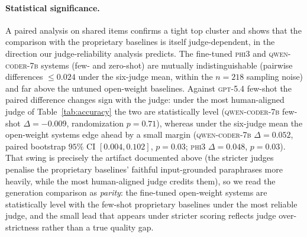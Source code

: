 \paragraph{Statistical significance.}
A paired analysis on shared items confirms a tight top cluster and shows that the comparison with the proprietary baselines is itself judge-dependent, in the direction our judge-reliability analysis predicts. The fine-tuned \textsc{phi3} and \textsc{qwen-coder-7b} systems (few- and zero-shot) are mutually indistinguishable (pairwise differences $\le 0.024$ under the six-judge mean, within the $n{=}218$ sampling noise) and far above the untuned open-weight baselines. Against \textsc{gpt-5.4} few-shot the paired difference changes sign with the judge: under the most human-aligned judge of Table~\ref{tab:accuracy} the two are statistically level (\textsc{qwen-coder-7b} few-shot $\Delta=-0.009$, randomization $p=0.71$), whereas under the six-judge mean the open-weight systems edge ahead by a small margin (\textsc{qwen-coder-7b} $\Delta=0.052$, paired bootstrap $95\%$ CI $[0.004,0.102]$, $p=0.03$; \textsc{phi3} $\Delta=0.048$, $p=0.03$). That swing is precisely the artifact documented above (the stricter judges penalise the proprietary baselines' faithful input-grounded paraphrases more heavily, while the most human-aligned judge credits them), so we read the generation comparison as \emph{parity}: the fine-tuned open-weight systems are statistically level with the few-shot proprietary baselines under the most reliable judge, and the small lead that appears under stricter scoring reflects judge over-strictness rather than a true quality gap.

